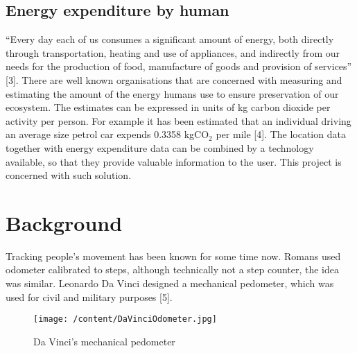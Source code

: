 \documentclass[12pt, a4paper]{report}   %
\begin{document}
\section{Energy expenditure by human}
“Every day each of us consumes a significant amount of energy, both directly through transportation, heating and use of appliances, and indirectly from our needs for the production of food, manufacture of goods and provision of services” [3]. There are well known organisations that are concerned with measuring and estimating the amount of the energy humans use to ensure preservation of our ecosystem. The estimates can be expressed in units of kg carbon dioxide per activity per person. For example it has been estimated that an individual driving an average size petrol car expends 0.3358 kgCO$_{2}$ per mile [4].
The location data together with energy expenditure data can be combined by a technology available, so that they provide valuable information to the user. This project is concerned with such solution.



\chapter{Background}
Tracking people's movement has been known for some time now. Romans used odometer calibrated to steps, although technically not a step counter, the idea was similar. Leonardo Da Vinci designed a mechanical pedometer, which was used for civil and military purposes [5].\\


\begin{figure}[H]
  \centering
	\texttt{[image: /content/DaVinciOdometer.jpg]}
	  \caption{Da Vinci's mechanical pedometer}
\end{figure}
\end{document}
